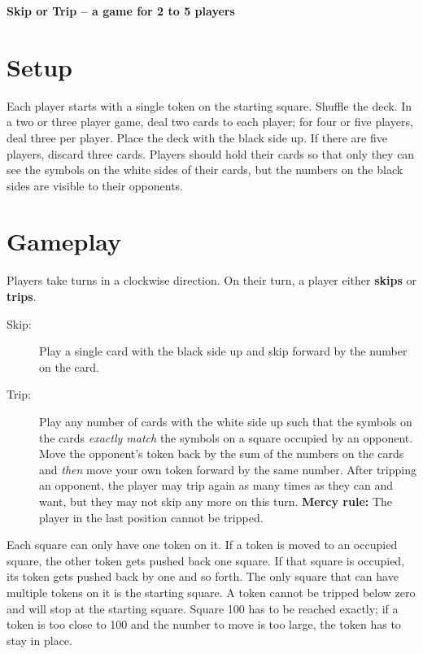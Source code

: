 \documentclass{article}
\begin{document}
{\center\LARGE\textbf{Skip or Trip -- a game for 2 to 5 players}}

\section*{Setup}

Each player starts with a single token on the starting square. Shuffle the deck. In a two or three player game, deal two cards to each player; for four or five players, deal three per player. Place the deck with the black side up. If there are five players, discard three cards. Players should hold their cards so that only they can see the symbols on the white sides of their cards, but the numbers on the black sides are visible to their opponents.

\section*{Gameplay}

Players take turns in a clockwise direction. On their turn, a player either \textbf{skips} or \textbf{trips}.

\begin{description}

\item[Skip:] Play a single card with the black side up and skip forward by the number on the card.

\item[Trip:] Play any number of cards with the white side up such that the symbols on the cards \textit{exactly match} the symbols on a square occupied by an opponent. Move the opponent's token back by the sum of the numbers on the cards and \textit{then} move your own token forward by the same number. After tripping an opponent, the player may trip again as many times as they can and want, but they may not skip any more on this turn. \textbf{Mercy rule:} The player in the last position cannot be tripped.

\end{description}

Each square can only have one token on it. If a token is moved to an occupied square, the other token gets pushed back one square. If that square is occupied, its token gets pushed back by one and so forth. The only square that can have multiple tokens on it is the starting square. A token cannot be tripped below zero and will stop at the starting square. Square 100 has to be reached exactly; if a token is too close to 100 and the number to move is too large, the token has to stay in place. 
\end{document}

